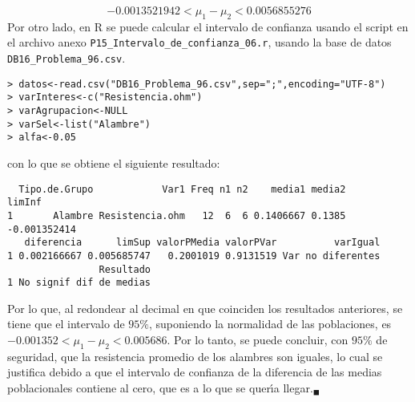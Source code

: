 \begin{solucion}
 \begin{equation*}
  -0.0013521942 < \mu_1 - \mu_2 < 0.0056855276
 \end{equation*}
 Por otro lado, en R se puede calcular el intervalo de confianza usando el script en el archivo anexo \texttt{P15\_Intervalo\_de\_confianza\_06.r}, usando la base de datos \texttt{DB16\_Problema\_96.csv}.
 \begin{verbatim}
> datos<-read.csv("DB16_Problema_96.csv",sep=";",encoding="UTF-8")
> varInteres<-c("Resistencia.ohm")
> varAgrupacion<-NULL
> varSel<-list("Alambre")
> alfa<-0.05
 \end{verbatim}
 \vspace{-0.5cm}
 con lo que se obtiene el siguiente resultado:
 \begin{verbatim}
  Tipo.de.Grupo            Var1 Freq n1 n2    media1 media2       limInf
1       Alambre Resistencia.ohm   12  6  6 0.1406667 0.1385 -0.001352414
   diferencia      limSup valorPMedia valorPVar          varIgual
1 0.002166667 0.005685747   0.2001019 0.9131519 Var no diferentes
                Resultado
1 No signif dif de medias
 \end{verbatim}
 \vspace{-0.5cm}
 Por lo que, al redondear al decimal en que coinciden los resultados anteriores, se tiene que el intervalo de $95\%$, suponiendo la normalidad de las poblaciones, es $-0.001352 < \mu_1 - \mu_2 < 0.005686$. Por lo tanto, se puede concluir, con $95\%$ de seguridad, que la resistencia promedio de los alambres son iguales, lo cual se justifica debido a que el intervalo de confianza de la diferencia de las medias poblacionales contiene al cero, que es a lo que se quer\'{\i}a llegar.${}_{\blacksquare}$
\end{solucion}
